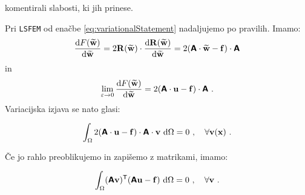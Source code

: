 komentirali slabosti, ki jih prinese.

Pri \texttt{LSFEM} od enačbe \eqref{eq:variationalStatement} nadaljujemo po pravilih. Imamo:
\begin{equation}
	\frac{\mathrm{d} F(\widetilde{\mathbf{w}})}{\mathrm{d} \widetilde{\mathbf{w}}} = 2 \mathbf{R(\widetilde{w})} \cdot \frac{\mathrm{d} \mathbf{R(\widetilde{w})}}{\mathrm{d} \mathbf{\widetilde{w}}} = 2 (\bm{\mathsf{A}} \cdot \mathbf{\widetilde{w}} - \mathbf{f}) \cdot \bm{\mathsf{A}}
\end{equation}
in
\begin{equation}
	\lim_{\varepsilon \rightarrow 0} \frac{\mathrm{d} F(\widetilde{\mathbf{w}})}{\mathrm{d} \widetilde{\mathbf{w}}} = 2 (\bm{\mathsf{A}} \cdot \mathbf{u} - \mathbf{f}) \cdot \bm{\mathsf{A}} \ .
\end{equation}
Variacijska izjava se nato glasi:
\begin{equation}
	\int_{\Omega} 2 (\mathbsf{A} \cdot \mathbf{u} - \mathbf{f}) \cdot \mathbsf{A} \cdot \mathbf{v} \ \ud \Omega = 0 \ , \quad \forall \mathbf{v(\mathbf{x})} \ . \vphantom{\Biggr{)}}
\end{equation}
Če jo rahlo preoblikujemo in zapišemo z matrikami, imamo:
\begin{equation}
	\int_{\Omega} (\mathbsf{A} \mathbf{v})^\mathsf{T} (\mathbsf{A} \mathbf{u} - \mathbf{f}) \ \ud \Omega = 0 \ , \quad \forall \mathbf{v} \ . \vphantom{\Biggr{)}}
\end{equation}